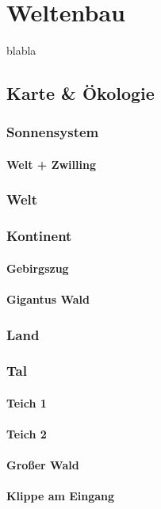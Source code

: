 \chapter{Weltenbau}
blabla

\section{Karte \& Ökologie}
\subsection{Sonnensystem}
\subsubsection{Welt + Zwilling}

\subsection{Welt}
\subsection{Kontinent}
\subsubsection{Gebirgszug}
\subsubsection{Gigantus Wald}

\subsection{Land}
\subsection{Tal}
\subsubsection{Teich 1}
\subsubsection{Teich 2}
\subsubsection{Großer Wald}
\subsubsection{Klippe am Eingang}

